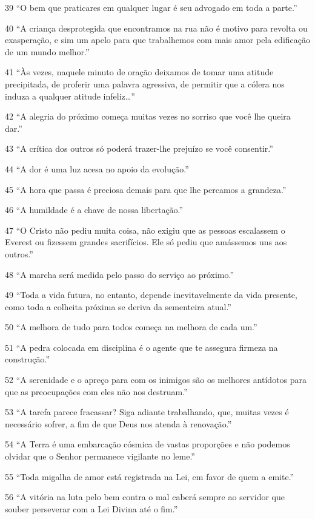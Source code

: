 39 ``O bem que praticares em qualquer lugar é seu advogado em toda a parte.”

40 ``A criança desprotegida que encontramos na rua não é motivo para revolta ou exasperação, e sim um apelo para que trabalhemos com mais amor pela edificação de um mundo melhor.”

41 ``Às vezes, naquele minuto de oração deixamos de tomar uma atitude precipitada, de proferir uma palavra agressiva, de permitir que a cólera nos induza a qualquer atitude infeliz…”

42 ``A alegria do próximo começa muitas vezes no sorriso que você lhe queira dar.”

43 ``A crítica dos outros só poderá trazer-lhe prejuízo se você consentir.”

44 ``A dor é uma luz acesa no apoio da evolução.”

45 ``A hora que passa é preciosa demais para que lhe percamos a grandeza.”

46 ``A humildade é a chave de nossa libertação.”

47 ``O Cristo não pediu muita coisa, não exigiu que as pessoas escalassem o Everest ou fizessem grandes sacrifícios. Ele só pediu que amássemos uns aos outros.”

48 ``A marcha será medida pelo passo do serviço ao próximo.”

49 ``Toda a vida futura, no entanto, depende inevitavelmente da vida presente, como toda a colheita próxima se deriva da sementeira atual.”

50 ``A melhora de tudo para todos começa na melhora de cada um.”

51 ``A pedra colocada em disciplina é o agente que te assegura firmeza na construção.”

52 ``A serenidade e o apreço para com os inimigos são os melhores antídotos para que as preocupações com eles não nos destruam.”

53 ``A tarefa parece fracassar? Siga adiante trabalhando, que, muitas vezes é necessário sofrer, a fim de que Deus nos atenda à renovação.”

54 ``A Terra é uma embarcação cósmica de vastas proporções e não podemos olvidar que o Senhor permanece vigilante no leme.”

55 ``Toda migalha de amor está registrada na Lei, em favor de quem a emite.”

56 ``A vitória na luta pelo bem contra o mal caberá sempre ao servidor que souber perseverar com a Lei Divina até o fim.”

